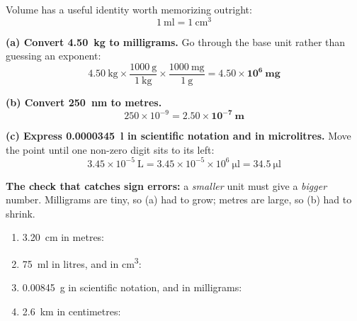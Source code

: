 \documentclass{apchem-worksheet}
\begin{document}
Volume has a useful identity worth memorizing outright:
\[ \SI{1}{\milli\litre} = \SI{1}{\centi\meter\cubed} \]

\begin{workedexample}
\textbf{(a) Convert \SI{4.50}{\kilo\gram} to milligrams.} Go through the
base unit rather than guessing an exponent:
\[ 4.50~\text{kg} \times \frac{1000~\text{g}}{1~\text{kg}}
   \times \frac{1000~\text{mg}}{1~\text{g}}
   = \mathbf{4.50\times10^{6}~mg} \]

\textbf{(b) Convert \SI{250}{\nano\meter} to metres.}
\[ 250 \times 10^{-9} = \mathbf{2.50\times10^{-7}~m} \]

\textbf{(c) Express \SI{0.0000345}{\litre} in scientific notation and
in microlitres.} Move the point until one non-zero digit sits to its
left:
\[ 3.45\times10^{-5}~\text{L}
   = 3.45\times10^{-5} \times 10^{6}~\si{\micro\litre}
   = \mathbf{34.5}~\si{\micro\litre} \]

\textbf{The check that catches sign errors:} a \emph{smaller} unit must
give a \emph{bigger} number. Milligrams are tiny, so (a) had to grow;
metres are large, so (b) had to shrink.
\end{workedexample}

\begin{yourturn}
\begin{enumerate}[leftmargin=*,itemsep=0.5em]
  \item \SI{3.20}{\centi\meter} in metres: \workspace[1.2cm]
  \item \SI{75}{\milli\litre} in litres, and in \si{\centi\meter\cubed}:
        \workspace[1.4cm]
  \item \SI{0.00845}{\gram} in scientific notation, and in milligrams:
        \workspace[1.4cm]
  \item \SI{2.6}{\kilo\meter} in centimetres: \workspace[1.4cm]
\end{enumerate}
\end{yourturn}
\end{document}
